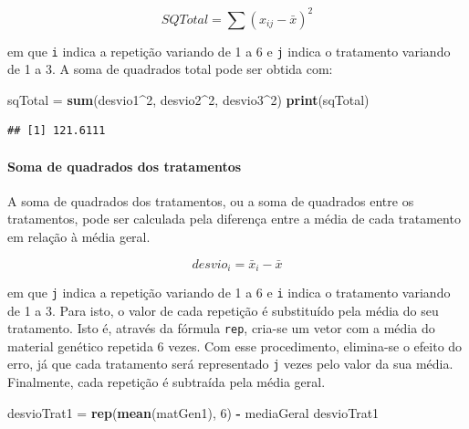 \documentclass[
]{article}
\newenvironment{Shaded}{\begin{snugshade}}{\end{snugshade}}
\newcommand{\DecValTok}[1]{\textcolor[rgb]{0.00,0.00,0.81}{#1}}
\newcommand{\KeywordTok}[1]{\textcolor[rgb]{0.13,0.29,0.53}{\textbf{#1}}}
\newcommand{\NormalTok}[1]{#1}
\newcommand{\OperatorTok}[1]{\textcolor[rgb]{0.81,0.36,0.00}{\textbf{#1}}}
\newcommand{\StringTok}[1]{\textcolor[rgb]{0.31,0.60,0.02}{#1}}
\begin{document}
\[SQTotal = \sum (x_{ij} - \bar{x})^2\]

em que \texttt{i} indica a repetição variando de 1 a 6 e \texttt{j} indica o tratamento variando de 1 a 3. A soma de quadrados total pode ser obtida com:

\begin{Shaded}
\begin{Highlighting}[]
\NormalTok{sqTotal =}\StringTok{ }\KeywordTok{sum}\NormalTok{(desvio1}\OperatorTok{^}\DecValTok{2}\NormalTok{, desvio2}\OperatorTok{^}\DecValTok{2}\NormalTok{, desvio3}\OperatorTok{^}\DecValTok{2}\NormalTok{)}
\KeywordTok{print}\NormalTok{(sqTotal)}
\end{Highlighting}
\end{Shaded}

\begin{verbatim}
## [1] 121.6111
\end{verbatim}

\hypertarget{soma-de-quadrados-dos-tratamentos}{%
\paragraph{Soma de quadrados dos tratamentos}\label{soma-de-quadrados-dos-tratamentos}}

A soma de quadrados dos tratamentos, ou a soma de quadrados entre os tratamentos, pode ser calculada pela diferença entre a média de cada tratamento em relação à média geral.

\[desvio_{i} = \bar{x}_{i} - \bar{x}\]

em que \texttt{j} indica a repetição variando de 1 a 6 e \texttt{i} indica o tratamento variando de 1 a 3. Para isto, o valor de cada repetição é substituído pela média do seu tratamento. Isto é, através da fórmula \texttt{rep}, cria-se um vetor com a média do material genético repetida 6 vezes. Com esse procedimento, elimina-se o efeito do erro, já que cada tratamento será representado \texttt{j} vezes pelo valor da sua média. Finalmente, cada repetição é subtraída pela média geral.

\begin{Shaded}
\begin{Highlighting}[]
\NormalTok{desvioTrat1 =}\StringTok{ }\KeywordTok{rep}\NormalTok{(}\KeywordTok{mean}\NormalTok{(matGen1), }\DecValTok{6}\NormalTok{) }\OperatorTok{-}\StringTok{ }\NormalTok{mediaGeral}
\NormalTok{desvioTrat1}
\end{Highlighting}
\end{Shaded}
\end{document}
